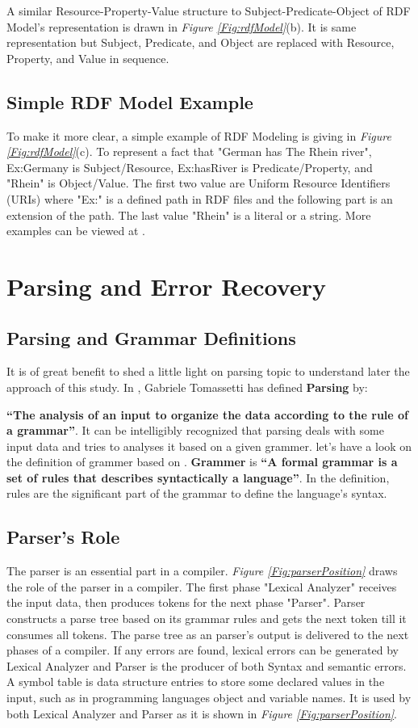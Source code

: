 A similar Resource-Property-Value structure to Subject-Predicate-Object of RDF Model's representation is drawn in {\it Figure \ref{Fig:rdfModel}}(b). It is same representation but Subject, Predicate, and Object are replaced with Resource, Property, and Value in sequence.  
\subsection{Simple RDF Model Example}

To make it more clear, a simple example of RDF Modeling is giving in {\it Figure \ref{Fig:rdfModel}}(c). To represent a fact that "German has The Rhein river", Ex:Germany is Subject/Resource, Ex:hasRiver is Predicate/Property, and "Rhein" is Object/Value. The first two value are Uniform Resource Identifiers (URIs) where "Ex:" is a defined path in RDF files and the following part is an extension of the path. The last value "Rhein" is a literal or a string. More examples can be viewed at \cite{W3C:RDF-Primer:Online}.

\section{Parsing and Error Recovery}
\subsection{Parsing and Grammar Definitions}
It is of great benefit to shed a little light on parsing topic to understand later the approach of this study. In \cite{parsingGuide2017}, Gabriele Tomassetti has defined \textbf{Parsing} by:

	\textbf{``The analysis of an input to organize the data according to the rule of a grammar''}. It can be intelligibly recognized that parsing deals with some input data and tries to analyses it based on a given grammer. let's have a look on the definition of grammer based on  \cite{parsingGuide2017}. \textbf{Grammer} is 
\textbf{``A formal grammar is a set of rules that describes syntactically a language''}. In the definition, rules are the significant part of the grammar to define the language's syntax.  
\subsection{Parser's Role}
The parser is an essential part in a compiler. {\it Figure \ref{Fig:parserPosition}} draws the role of the parser in a compiler. The first phase "Lexical Analyzer" receives the input data, then produces tokens for the next phase "Parser". Parser constructs a parse tree based on its grammar rules and gets the next token till it consumes all tokens. The parse tree as an parser's output is delivered to the next phases of a compiler. If any errors are found, lexical errors can be generated by Lexical Analyzer and Parser is the producer of both Syntax and semantic errors.%
 A symbol table is data structure entries to store some declared values in the input, such as in programming languages object and variable names. It is used by both  Lexical Analyzer and Parser as it is shown in {\it Figure \ref{Fig:parserPosition}}.

